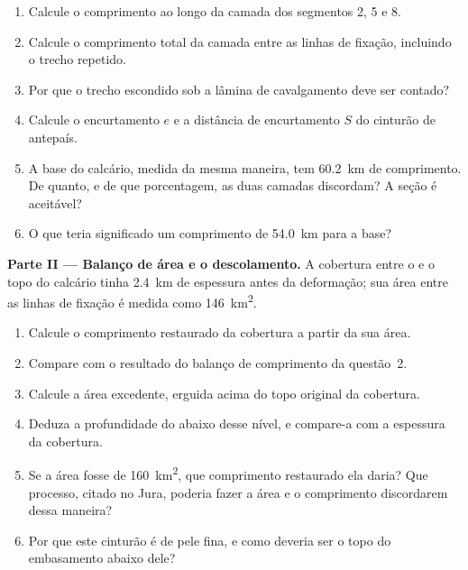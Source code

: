 \begin{problem}
\begin{enumerate}
\item Calcule o comprimento ao longo da camada dos segmentos 2, 5 e 8.
\item Calcule o comprimento total da camada entre as linhas de fixação, incluindo o trecho
repetido.
\item Por que o trecho escondido sob a lâmina de cavalgamento deve ser contado?
\item Calcule o encurtamento $e$ e a distância de encurtamento $S$ do cinturão de antepaís.
\item A base do calcário, medida da mesma maneira, tem \qty{60.2}{km} de comprimento. De quanto,
e de que porcentagem, as duas camadas discordam? A seção é aceitável?
\item O que teria significado um comprimento de \qty{54.0}{km} para a base?
\end{enumerate}

\noindent\textbf{Parte II --- Balanço de área e o descolamento.} A cobertura entre o
 e o topo do calcário tinha \qty{2.4}{km} de espessura antes da deformação; sua
área entre as linhas de fixação é medida como \qty{146}{km^2}.
\begin{enumerate}[resume]
\item Calcule o comprimento restaurado da cobertura a partir da sua área.
\item Compare com o resultado do balanço de comprimento da questão~2.
\item Calcule a área excedente, erguida acima do topo original da cobertura.
\item Deduza a profundidade do  abaixo desse nível, e compare-a com a espessura
da cobertura.
\item Se a área fosse de \qty{160}{km^2}, que comprimento restaurado ela daria? Que processo,
citado no Jura, poderia fazer a área e o comprimento discordarem dessa maneira?
\item Por que este cinturão é de pele fina, e como deveria ser o topo do embasamento
abaixo dele?
\end{enumerate}


\end{problem}
